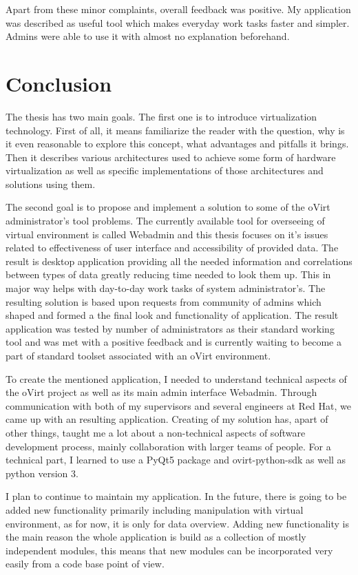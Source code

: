 Apart from these minor complaints, overall feedback was positive. My application was described as useful tool which makes everyday work tasks faster and simpler. Admins were able to use it with almost no explanation beforehand. 


\chapter{Conclusion}
The thesis has two main goals. The first one is to introduce virtualization technology. First of all, it means familiarize the reader with the question, why is it even reasonable to explore this concept, what advantages and pitfalls it brings. Then it describes various architectures used to achieve some form of hardware virtualization as well as specific implementations of those architectures and solutions using them.

The second goal is to propose and implement a solution to some of the oVirt administrator's tool problems. The currently available tool for overseeing of virtual environment is called Webadmin and this thesis focuses on it's issues related to effectiveness of user interface and accessibility of provided data. The result is desktop application providing all the needed information and correlations between types of data greatly reducing time needed to look them up. This in major way helps with day-to-day work tasks of system administrator's. The resulting solution is based upon requests from community of admins which shaped and formed a the final look and functionality of application. The result application was tested by number of administrators as their standard working tool and was met with a positive feedback and is currently waiting to become a part of standard toolset associated with an oVirt environment.

To create the mentioned application, I needed to understand technical aspects of the oVirt project as well as its main admin interface Webadmin. Through communication with both of my supervisors and several engineers at Red Hat, we came up with an resulting application. Creating of my solution has, apart of other things, taught me a lot about a non-technical aspects of software development process, mainly collaboration with larger teams of people. For a technical part, I learned to use a PyQt5 package and ovirt-python-sdk as well as python version 3.

I plan to continue to maintain my application. In the future, there is going to be added new functionality primarily including manipulation with virtual environment, as for now, it is only for data overview. Adding new functionality is the main reason the whole application is build as a collection of mostly independent modules, this means that new modules can be incorporated very easily from a code base point of view.



